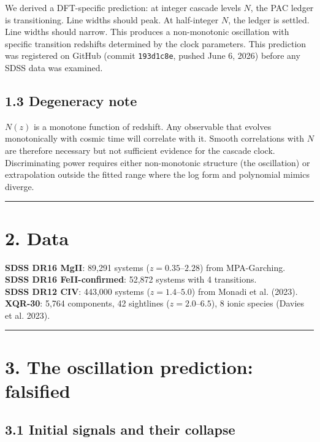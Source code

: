 \documentclass[11pt,a4paper]{article}
\begin{document}
We derived a DFT-specific prediction: at integer cascade levels $N$, the PAC ledger is transitioning. Line widths should peak. At half-integer $N$, the ledger is settled. Line widths should narrow. This produces a non-monotonic oscillation with specific transition redshifts determined by the clock parameters. This prediction was registered on GitHub (commit \texttt{193d1c8e}, pushed June 6, 2026) before any SDSS data was examined.

\subsection*{1.3 Degeneracy note}

$N(z)$ is a monotone function of redshift. Any observable that evolves monotonically with cosmic time will correlate with it. Smooth correlations with $N$ are therefore necessary but not sufficient evidence for the cascade clock. Discriminating power requires either non-monotonic structure (the oscillation) or extrapolation outside the fitted range where the log form and polynomial mimics diverge.

\begin{center}\rule{0.5\linewidth}{0.4pt}\end{center}

\section*{2. Data}

\textbf{SDSS DR16 MgII}: 89,291 systems ($z = 0.35$–$2.28$) from MPA-Garching. \\
\textbf{SDSS DR16 FeII-confirmed}: 52,872 systems with 4 transitions. \\
\textbf{SDSS DR12 CIV}: 443,000 systems ($z = 1.4$–$5.0$) from Monadi et al. (2023). \\
\textbf{XQR-30}: 5,764 components, 42 sightlines ($z = 2.0$–$6.5$), 8 ionic species (Davies et al. 2023).

\begin{center}\rule{0.5\linewidth}{0.4pt}\end{center}

\section*{3. The oscillation prediction: falsified}

\subsection*{3.1 Initial signals and their collapse}
\end{document}

